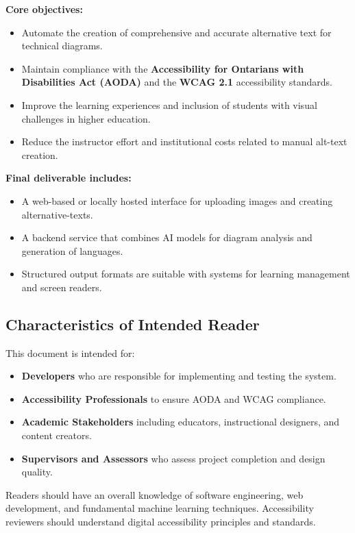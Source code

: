 \documentclass[12pt]{article}
\begin{document}
\noindent \textbf{Core objectives:}
\begin{itemize}
    \item Automate the creation of comprehensive and accurate alternative text for technical diagrams.
    \item Maintain compliance with the \textbf{Accessibility for Ontarians with Disabilities Act (AODA)} and the \textbf{WCAG 2.1} accessibility standards.
    \item Improve the learning experiences and inclusion of students with visual challenges in higher education.
    \item Reduce the instructor effort and institutional costs related to manual alt-text creation.
\end{itemize}

\noindent \textbf{Final deliverable includes:}
\begin{itemize}
    \item A web-based or locally hosted interface for uploading images and creating alternative-texts.
    \item A backend service that combines AI models for diagram analysis and generation of languages.
    \item Structured output formats are suitable with systems for learning management and screen readers.
\end{itemize}

\subsection{Characteristics of Intended Reader}
This document is intended for:
\begin{itemize}
    \item \textbf{Developers} who are responsible for implementing and testing the system.
    \item \textbf{Accessibility Professionals} to ensure AODA and WCAG compliance.
    \item \textbf{Academic Stakeholders} including educators, instructional designers, and content creators.
    \item \textbf{Supervisors and Assessors} who assess project completion and design quality.
\end{itemize}

Readers should have an overall knowledge of software engineering, web development, and fundamental machine learning techniques. Accessibility reviewers should understand digital accessibility principles and standards.
\end{document}
